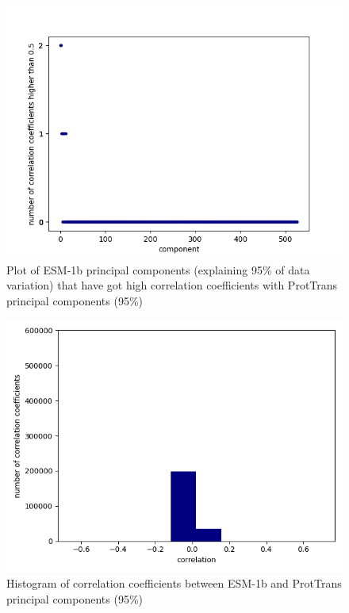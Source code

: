 \documentclass[12pt]{article}
\begin{document}
	\begin{figure}[h!]
		\centering
		\includegraphics[scale=0.85]{validation_small_set_2_joined_PC_95_correlation_high_corr.png}

		\caption{Plot of ESM-1b principal components (explaining 
		95\% of data variation) that have got high correlation coefficients 
		with ProtTrans principal components (95\%)}
		\label{figure:highCorrelationComponentsPC95}
	\end{figure}

	\newpage

	\begin{figure}[h!]
		\centering
		\includegraphics[scale=0.85]{validation_small_set_2_joined_PC_95_correlation_hist.png}

		\caption{Histogram of correlation coefficients between ESM-1b 
		and ProtTrans principal components (95\%)}
		\label{figure:correlationComponentsHistoPC95}
	\end{figure}
\end{document}
